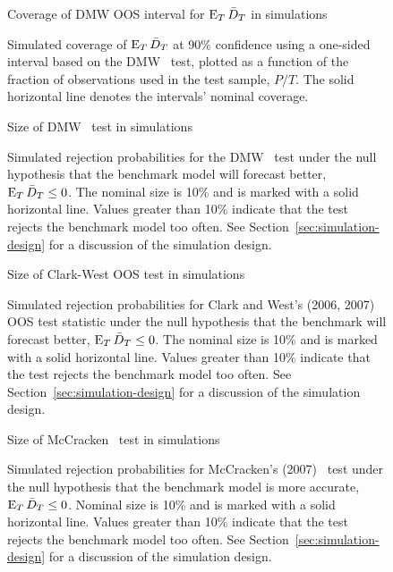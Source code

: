 \documentclass[12pt]{article}
\begin{document}
\begin{figure}\centering
  {\large Coverage of DMW OOS interval for $\operatorname{E}_T\bar{D}_{T}$ in simulations}
  \caption{Simulated coverage of $\operatorname{E}_T \bar{D}_{T}$ at 90\% confidence using
    a one-sided interval based on the DMW \oost\ test, plotted as a
    function of the fraction of observations used in the test sample,
    $P/T$.  The solid horizontal line denotes the intervals' nominal
    coverage.}
  \label{fig:interval-T}
\end{figure}
\clearpage

\begin{figure}\centering
  {\large Size of DMW \oost\ test in simulations}
  \caption{Simulated rejection probabilities for the DMW \oost\ test
    under the null hypothesis that the benchmark model will forecast
    better, $\operatorname{E}_T \bar{D}_{T} \leq 0$. The nominal size is 10\% and is
    marked with a solid horizontal line. Values greater than 10\%
    indicate that the test rejects the benchmark model too often. See
    Section~\ref{sec:simulation-design} for a discussion of the
    simulation design.}
  \label{fig:ttest-size}
\end{figure}
\clearpage

\begin{figure}\centering
  {\large Size of Clark-West OOS test in simulations}
  \caption{Simulated rejection probabilities for Clark and West's
    (2006, 2007) OOS test statistic under the null hypothesis that the
    benchmark will forecast better, $\operatorname{E}_T \bar{D}_{T} \leq 0$. The nominal
    size is 10\% and is marked with a solid horizontal line. Values
    greater than 10\% indicate that the test rejects the benchmark
    model too often. See Section~\ref{sec:simulation-design} for a
    discussion of the simulation design.}
   \label{fig:clarkwest}
\end{figure}
\clearpage

\begin{figure}\centering
  {\large Size of McCracken \oost\ test in simulations}
  \caption{Simulated rejection probabilities for McCracken's (2007)
    \oost\ test under the null hypothesis that the benchmark model is
    more accurate, $\operatorname{E}_T \bar{D}_{T} \leq 0$. Nominal size is 10\% and is
    marked with a solid horizontal line. Values greater than 10\%
    indicate that the test rejects the benchmark model too often. See
    Section~\ref{sec:simulation-design} for a discussion of the
    simulation design.}
  \label{fig:mccracken}
\end{figure}
\clearpage
\end{document}
